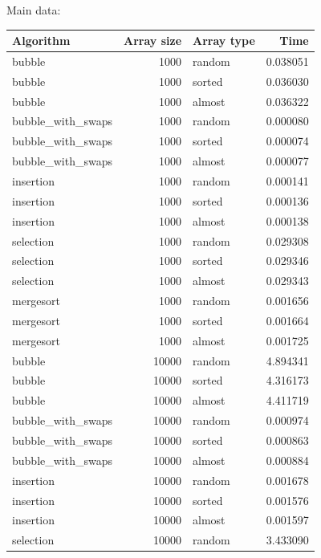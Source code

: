 \documentclass[letterpaper, 11pt]{article}
\begin{document}
Main data:
\begin{longtable}{lrlr}
  Algorithm &  Array size & Array type & Time \\
             \hline
            bubble &      1000 &   random &    0.038051 \\
            bubble &      1000 &   sorted &    0.036030 \\
            bubble &      1000 &   almost &    0.036322 \\
 bubble\_with\_swaps &      1000 &   random &    0.000080 \\
 bubble\_with\_swaps &      1000 &   sorted &    0.000074 \\
 bubble\_with\_swaps &      1000 &   almost &    0.000077 \\
         insertion &      1000 &   random &    0.000141 \\
         insertion &      1000 &   sorted &    0.000136 \\
         insertion &      1000 &   almost &    0.000138 \\
         selection &      1000 &   random &    0.029308 \\
         selection &      1000 &   sorted &    0.029346 \\
         selection &      1000 &   almost &    0.029343 \\
         mergesort &      1000 &   random &    0.001656 \\
         mergesort &      1000 &   sorted &    0.001664 \\
         mergesort &      1000 &   almost &    0.001725 \\
            bubble &     10000 &   random &    4.894341 \\
            bubble &     10000 &   sorted &    4.316173 \\
            bubble &     10000 &   almost &    4.411719 \\
 bubble\_with\_swaps &     10000 &   random &    0.000974 \\
 bubble\_with\_swaps &     10000 &   sorted &    0.000863 \\
 bubble\_with\_swaps &     10000 &   almost &    0.000884 \\
         insertion &     10000 &   random &    0.001678 \\
         insertion &     10000 &   sorted &    0.001576 \\
         insertion &     10000 &   almost &    0.001597 \\
         selection &     10000 &   random &    3.433090 \\

\end{longtable}
\end{document}
